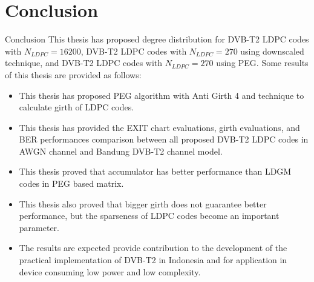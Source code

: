 \documentclass[11pt, aspectratio=169]{beamer}
\begin{document}
\section{Conclusion}
\begin{frame}{Conclusion}
\small
This thesis has proposed degree distribution for DVB-T2 LDPC codes with $N_{LDPC}=16200$, DVB-T2 LDPC codes with $N_{LDPC}=270$ using downscaled technique, and DVB-T2 LDPC codes with $N_{LDPC}=270$ using PEG. Some results of this thesis are provided as follows:
\begin{itemize}
\justifying

\item This thesis has proposed PEG algorithm with Anti Girth 4 and technique to calculate girth of LDPC codes.
\item This thesis has provided the EXIT chart evaluations, girth evaluations, and BER performances comparison between all proposed DVB-T2 LDPC codes in AWGN channel and Bandung DVB-T2 channel model. 
\item This thesis proved that accumulator has better performance than LDGM codes in PEG based matrix.
\item This thesis also proved that bigger girth does not guarantee better performance, but the sparseness of LDPC codes become an important parameter.
\item The results are expected provide contribution to the development of the practical implementation of DVB-T2 in Indonesia and for application in device consuming low power and low complexity. 
\end{itemize}
\end{frame}
\end{document}
